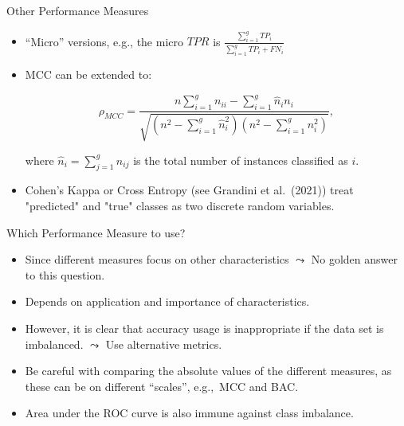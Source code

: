 \documentclass[11pt,compress,t,notes=noshow, xcolor=table]{beamer}
\begin{document}
\begin{frame}{Other Performance Measures}

	\small{

		\begin{itemize}
		
			\item ``Micro'' versions, e.g., the micro $TPR$ is $\frac{\sum_{i=1}^g TP_i}{\sum_{i=1}^g TP_i + FN_i}$ 
            \vspace{10pt}
		
			\item MCC can be extended to:
			
			$$   \rho_{MCC} = \frac{ n  \sum_{i=1}^g n_{ii} -  \sum_{i=1}^g \hat n_i n_i}{\sqrt{ (n^2 - \sum_{i=1}^g \hat n_i^2)(n^2 - \sum_{i=1}^g n_i^2)  }},$$

			where $\hat n_i = \sum_{j=1}^g n_{ij}$ is the total number of instances classified as $i.$
            \vspace{10pt}
        
		
			\item Cohen's Kappa or Cross Entropy (see Grandini et al.\ (2021)) treat "predicted" and "true" classes as two discrete random variables.
		
		\end{itemize}
	}
\end{frame}


\begin{frame}{Which Performance Measure to use?}

	\small{

		\begin{itemize}

            \item Since different measures focus on other characteristics $\leadsto$ No golden answer to this question.
	
			\item Depends on application and importance of characteristics.

			\item However, it is clear that accuracy usage is inappropriate if the data set is imbalanced. $\leadsto$ Use alternative metrics.

			\item Be careful with comparing the absolute values of the different measures, as these can be on different ``scales'', e.g.,\ MCC and BAC. 

                \item Area under the ROC curve is also immune against class imbalance.
	
		\end{itemize}
	}
\end{frame}




\endlecture
\end{document}
